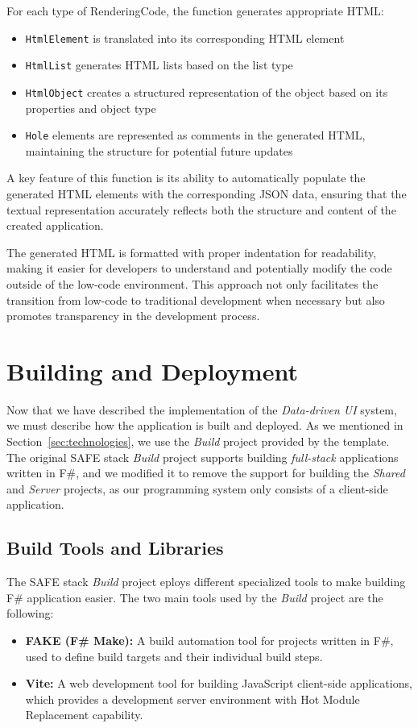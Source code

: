 For each type of RenderingCode, the function generates appropriate HTML:
\begin{itemize}
	\item \texttt{HtmlElement} is translated into its corresponding HTML element
	\item \texttt{HtmlList} generates HTML lists based on the list type
	\item \texttt{HtmlObject} creates a structured representation of the object based on its properties and object type
	\item \texttt{Hole} elements are represented as comments in the generated HTML, maintaining the structure for potential future updates
\end{itemize}

A key feature of this function is its ability to automatically populate the generated HTML elements with the corresponding JSON data,
ensuring that the textual representation accurately reflects both the structure and content of the created application.

The generated HTML is formatted with proper indentation for readability,
making it easier for developers to understand and potentially modify the code outside of the low-code environment.
This approach not only facilitates the transition from low-code to traditional development when necessary but also promotes transparency in the development process.

\section{Building and Deployment}
\label{sec:build}
Now that we have described the implementation of the \emph{Data-driven UI} system, we must describe how the application is built and deployed.
As we mentioned in Section~\ref{sec:technologies}, we use the \emph{Build} project provided by the \citet{safestack} template.
The original SAFE stack \emph{Build} project supports building \emph{full-stack} applications written in F\#, and we modified it to remove the support for building
the \emph{Shared} and \emph{Server} projects, as our programming system only consists of a client-side application.

\subsection{Build Tools and Libraries}
The SAFE stack \emph{Build} project eploys different specialized tools to make building F\# application easier.
The two main tools used by the \emph{Build} project are the following:
\begin{itemize}
	\item \textbf{FAKE (F\# Make):} A build automation tool for projects written in F\#, used to define build targets and their individual build steps.
	\item \textbf{Vite:} A web development tool for building JavaScript client-side applications, which provides a development server environment with Hot Module Replacement capability.
\end{itemize}


